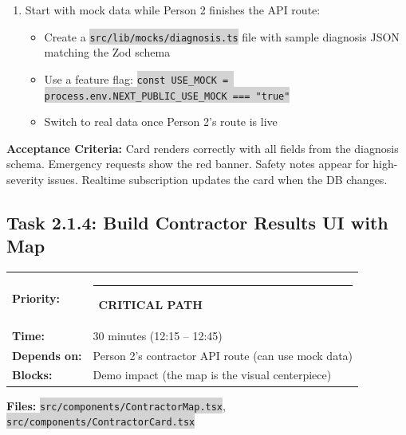 \documentclass[11pt, a4paper]{article}
\newcommand{\critical}{\textcolor{critred}{\rule{6pt}{6pt}}~\textcolor{critred}{\scriptsize\textbf{CRITICAL PATH}}}
\newcommand{\code}[1]{\texttt{\small\colorbox{lightgray}{#1}}}
\begin{document}
\begin{enumerate}[leftmargin=2em, itemsep=2pt]
\begin{itemize}[itemsep=1pt]
      \item Use Supabase Realtime to subscribe to changes on this specific request ID
      \item When the \code{diagnosis} column updates, the card renders automatically without page refresh
    \end{itemize}
  \item Start with mock data while Person 2 finishes the API route:
    \begin{itemize}[itemsep=1pt]
      \item Create a \code{src/lib/mocks/diagnosis.ts} file with sample diagnosis JSON matching the Zod schema
      \item Use a feature flag: \code{const USE\_MOCK = process.env.NEXT\_PUBLIC\_USE\_MOCK === "true"}
      \item Switch to real data once Person 2's route is live
    \end{itemize}
\end{enumerate}

\textbf{Acceptance Criteria:} Card renders correctly with all fields from the diagnosis schema. Emergency requests show the red banner. Safety notes appear for high-severity issues. Realtime subscription updates the card when the DB changes.

\vspace{1em}

\subsection{Task 2.1.4: Build Contractor Results UI with Map}

\begin{tabularx}{\textwidth}{lX}
\textbf{Priority:} & \critical \\
\textbf{Time:} & 30 minutes (12:15 -- 12:45) \\
\textbf{Depends on:} & Person 2's contractor API route (can use mock data) \\
\textbf{Blocks:} & Demo impact (the map is the visual centerpiece) \\
\end{tabularx}

\vspace{0.3em}

\textbf{Files:} \code{src/components/ContractorMap.tsx}, \code{src/components/ContractorCard.tsx}
\end{document}
